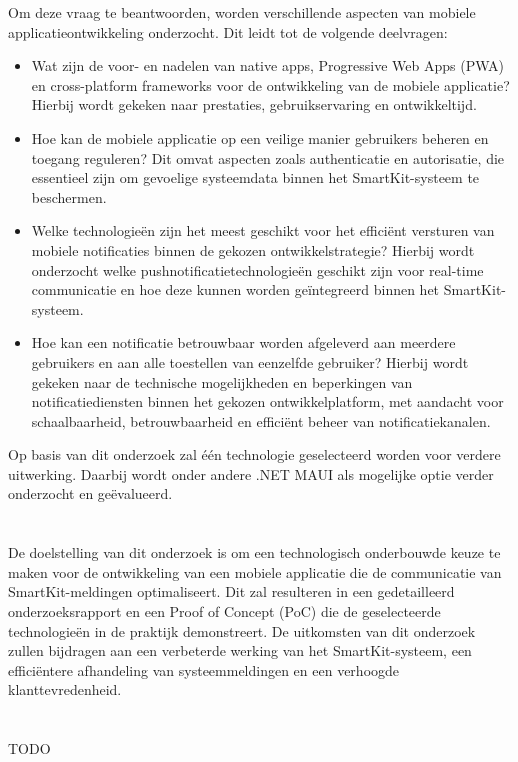 \noindent Om deze vraag te beantwoorden, worden verschillende aspecten van mobiele applicatieontwikkeling onderzocht. Dit leidt tot de volgende deelvragen:

\begin{itemize}
    \item Wat zijn de voor- en nadelen van native apps, Progressive Web Apps (PWA) en cross-platform frameworks voor de ontwikkeling van de mobiele applicatie? Hierbij wordt gekeken naar prestaties, gebruikservaring en ontwikkeltijd.
    
    \item Hoe kan de mobiele applicatie op een veilige manier gebruikers beheren en toegang reguleren? Dit omvat aspecten zoals authenticatie en autorisatie, die essentieel zijn om gevoelige systeemdata binnen het SmartKit-systeem te beschermen.
    
    \item Welke technologieën zijn het meest geschikt voor het efficiënt versturen van mobiele notificaties binnen de gekozen ontwikkelstrategie? Hierbij wordt onderzocht welke pushnotificatietechnologieën geschikt zijn voor real-time communicatie en hoe deze kunnen worden geïntegreerd binnen het SmartKit-systeem.
    
    \item Hoe kan een notificatie betrouwbaar worden afgeleverd aan meerdere gebruikers en aan alle toestellen van eenzelfde gebruiker? Hierbij wordt gekeken naar de technische mogelijkheden en beperkingen van notificatiediensten binnen het gekozen ontwikkelplatform, met aandacht voor schaalbaarheid, betrouwbaarheid en efficiënt beheer van notificatiekanalen.
\end{itemize}

\noindent Op basis van dit onderzoek zal één technologie geselecteerd worden voor verdere uitwerking. Daarbij wordt onder andere .NET MAUI als mogelijke optie verder onderzocht en geëvalueerd.


\section{}%
\label{sec:onderzoeksdoelstelling}

\noindent De doelstelling van dit onderzoek is om een technologisch onderbouwde keuze te maken voor de ontwikkeling van een mobiele applicatie die de communicatie van SmartKit-meldingen optimaliseert. Dit zal resulteren in een gedetailleerd onderzoeksrapport en een Proof of Concept (PoC) die de geselecteerde technologieën in de praktijk demonstreert. De uitkomsten van dit onderzoek zullen bijdragen aan een verbeterde werking van het SmartKit-systeem, een efficiëntere afhandeling van systeemmeldingen en een verhoogde klanttevredenheid. \\

\section{}%
\label{sec:opzet-bachelorproef}

TODO

